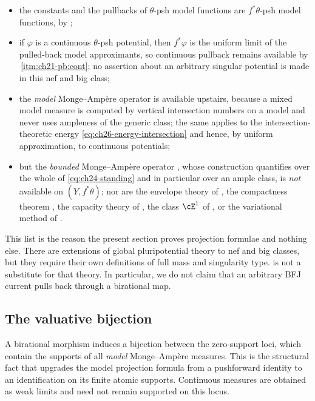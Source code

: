\begin{itemize}
\item the constants and the pullbacks of $\theta$-psh model functions are
$f^*\theta$-psh model functions, by
;
\item if $\varphi$ is a continuous $\theta$-psh potential, then
$f^*\varphi$ is the uniform limit of the pulled-back model approximants,
so continuous pullback remains available by
\,\cref{itm:ch21-pb:cont}; no assertion about an
arbitrary singular potential is made in this nef and big class;
\item the \emph{model} Monge--Amp\`ere operator is available upstairs,
because a mixed model measure is computed by vertical intersection numbers
on a model and never uses ampleness of the generic class; the same applies
to the intersection-theoretic energy \eqref{eq:ch26-energy-intersection} and
hence, by uniform approximation, to continuous potentials;
\item but the \emph{bounded} Monge--Amp\`ere operator
, whose construction quantifies over the
whole of \eqref{eq:ch24-standing} and in particular over an ample class, is
\emph{not} available on $(Y,f^*\theta)$; nor are the envelope theory of
, the compactness theorem
, the capacity theory of
, the class $\cE^1$ of , or
the variational method of
.
\end{itemize}

This list is the reason the present section proves projection formulae and
nothing else.  There are extensions of global pluripotential theory to nef
and big classes, but they require their own definitions of full mass and
singularity type.   is not a
substitute for that theory.  In particular, we do not claim that an
arbitrary BFJ current pulls back through a birational map.

\subsection{The valuative bijection}
\label{sec:ch30-birational-bijection}

A birational morphism induces a bijection between the zero-support loci,
which contain the supports of all \emph{model} Monge--Amp\`ere measures.
This is the structural fact that upgrades the model projection formula from
a pushforward identity to an identification on its finite atomic supports.
Continuous measures are obtained as weak limits and need not remain
supported on this locus.

